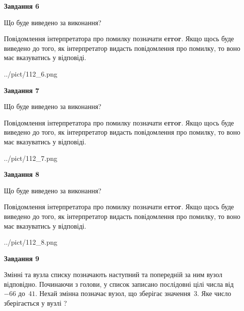 \documentclass[12pt, ukrainian]{article}
\begin{document}
{\begin {large}
{\begin {center}\textbf{Завдання 6}\end {center}}\par
Що буде виведено за виконання?

Повідомлення інтерпретатора про помилку позначати \textbf{error}.
Якщо щось буде виведено до того, як інтерпретатор видасть повідомлення про помилку, 
то воно має вказуватись у відповіді. \par


\begin{center}
	{../pict/112_6.png}
\end{center}
\newpage

{\begin {center}\textbf{Завдання 7}\end {center}}\par
Що буде виведено за виконання?

Повідомлення інтерпретатора про помилку позначати \textbf{error}.
Якщо щось буде виведено до того, як інтерпретатор видасть повідомлення про помилку, 
то воно має вказуватись у відповіді. \par


\begin{center}
	{../pict/112_7.png}
\end{center}
\newpage

{\begin {center}\textbf{Завдання 8}\end {center}}\par
Що буде виведено за виконання?

Повідомлення інтерпретатора про помилку позначати \textbf{error}.
Якщо щось буде виведено до того, як інтерпретатор видасть повідомлення про помилку, 
то воно має вказуватись у відповіді. \par


\begin{center}
	{../pict/112_8.png}
\end{center}
\newpage

{\begin {center}\textbf{Завдання 9}\end {center}}\par
Змінні  та  вузла списку позначають наступний та попередній за ним вузол відповідно. Починаючи з голови, у список записано послідовні цілі числа від~$-66$ до~$41$. Нехай змінна  позначає вузол, що зберігає значення~$3$.
Яке число зберігається у вузлі  ?\par
\newpage


\end{large}}
\end{document}
